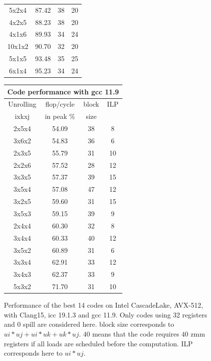 \documentclass{article}
\begin{document}
\begin{figure}[h!]
{\begin{tabular}{|c|c|c|c|}
5x2x4 & 87.42 & 38 & 20 \\
4x2x5 & 88.23 & 38 & 20 \\
4x1x6 & 89.93 & 34 & 24 \\
10x1x2 & 90.70 & 32 & 20 \\
5x1x5 & 93.48 & 35 & 25 \\
6x1x4 & 95.23 & 34 & 24 \\
\hline
    \end{tabular}
    \begin{tabular}{|c|c|c|c|}
      \hline
      \multicolumn{4}{|c|}{Code performance with gcc 11.9} \\
      \hline
      Unrolling & flop/cycle & block  & ILP\\
      ixkxj& in peak \% & size & \\
      \hline
2x5x4 & 54.09 & 38 & 8 \\
3x6x2 & 54.83 & 36 & 6 \\
2x3x5 & 55.79 & 31 & 10 \\
2x2x6 & 57.52 & 28 & 12 \\
3x3x5 & 57.37 & 39 & 15 \\
3x5x4 & 57.08 & 47 & 12 \\
3x2x5 & 59.60 & 31 & 15 \\
3x5x3 & 59.15 & 39 & 9 \\
2x4x4 & 60.30 & 32 & 8 \\
3x4x4 & 60.33 & 40 & 12 \\
3x5x2 & 60.89 & 31 & 6 \\
3x3x4 & 62.91 & 33 & 12 \\
3x4x3 & 62.37 & 33 & 9 \\
5x3x2 & 71.70 & 31 & 10 \\
\hline
    \end{tabular}
}
\caption{Performance of the best 14 codes on Intel CascadeLake, AVX-512, with Clang15,  icc 19.1.3 and gcc 11.9. Only codes using 32 registers and 0 spill are considered here\label{fig:tables}. block size corresponds to $ui*uj+ui*uk+uk*uj$. $40$ means that the code requires $40$ zmm registers if all loads are scheduled before the computation. ILP corresponds here to $ui*uj$.}
\end{figure}
\end{document}

